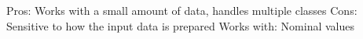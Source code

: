Pros: Works with a small amount of data, handles multiple classes
Cons: Sensitive to how the input data is prepared
Works with: Nominal values

